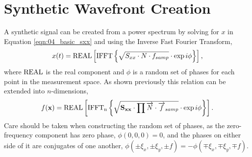 \section{Synthetic Wavefront Creation}
A synthetic signal can be created from a power spectrum by solving for $x$ in Equation \ref{eqn:04_basic_sxx} and using the Inverse Fast Fourier Transform,
\begin{equation}
 x(t) = \operatorname{REAL}\left[\operatorname{IFFT}\left\{\sqrt{S_{xx}\cdot N\cdot f_{samp}}\cdot\exp{i\phi}\right\}\right] \textrm{,}
 \label{eqn:05_ifft}
\end{equation}
where $\operatorname{REAL}$ is the real component and $\phi$ is a random set of phases for each point in the measurement space.
As shown previously this relation can be extended into $n$-dimensions,
\begin{equation}
 f(\mathbf{x}) = \operatorname{REAL}\left[\operatorname{IFFT_n}\left\{\sqrt{\mathbf{S_{xx}}\cdot\prod{\overrightarrow{N}\cdot \overrightarrow{f}_{samp}}}\cdot\exp{i\mathbf{\phi}}\right\}\right] \textrm{.}
 \label{eqn:05_ifftn}
\end{equation}
Care should be taken when constructing the random set of phases, as the zero-frequency component has zero phase, $\phi(0,0,0) = 0$, and the phases on either side of it are conjugates of one another, $\phi(\pm\xi_x,\pm\xi_y,\pm f)=-\phi(\mp\xi_x,\mp\xi_y,\mp f)$.

